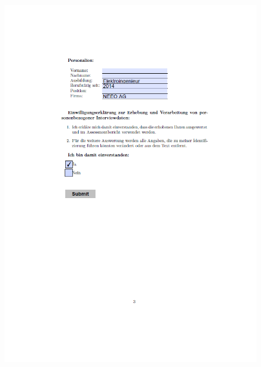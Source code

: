 \begin{figure}[ht]
 	\centering
	\includegraphics[width=1.3\textwidth]{images/Sandro3.png}
 	\label{fig:fragsan3}
\end{figure}


